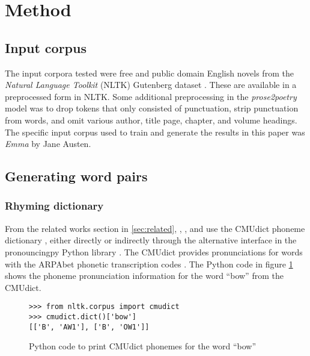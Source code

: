 \documentclass[11pt,a4paper]{article}
\begin{document}
\section{Method}
\label{sec:method}

\subsection{Input corpus}

The input corpora tested were free and public domain English novels from the \textit{Natural Language Toolkit} (NLTK) Gutenberg dataset \cite[Chapter~2]{gutenbergnltk}. These are available in a preprocessed form in NLTK. Some additional preprocessing in the \textit{prose2poetry} model was to drop tokens that only consisted of punctuation, strip punctuation from words, and omit various author, title page, chapter, and volume headings. The specific input corpus used to train and generate the results in this paper was \textit{Emma} by Jane Austen.

\subsection{Generating word pairs}

\subsubsection{Rhyming dictionary}

From the related works section in \ref{sec:related}, \citet{keswarani}, \citet{cole}, and \citet{hopkins-kiela-2017} use the CMUdict phoneme dictionary \cite{cmudict}, either directly or indirectly through the alternative interface in the pronouncingpy Python library \cite{pronouncingpy}. The CMUdict provides pronunciations for words with the ARPAbet phonetic transcription codes \cite[Chapter~27]{jurafsky}. The Python code in figure \ref{fig:cmudict} shows the phoneme pronunciation information for the word ``bow'' from the CMUdict.

\begin{figure}
\begin{Verbatim}[fontsize=\small]
>>> from nltk.corpus import cmudict
>>> cmudict.dict()['bow']
[['B', 'AW1'], ['B', 'OW1']]
\end{Verbatim}
\caption{Python code to print CMUdict phonemes for the word ``bow''}
\label{fig:cmudict}
\end{figure}
\end{document}
